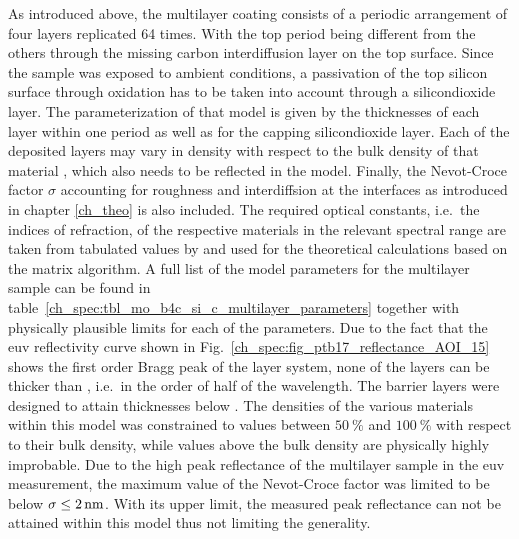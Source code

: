 As introduced above, the multilayer coating consists of a periodic arrangement of four layers replicated 64 times. With the top period being different from the others through the missing carbon interdiffusion layer on the top surface. Since the sample was exposed to ambient conditions, a passivation of the top silicon surface through oxidation has to be taken into account through a silicondioxide layer. The parameterization of that model is given by the thicknesses of each layer within one period as well as for the capping silicondioxide layer. Each of the deposited layers may vary in density with respect to the bulk density of that material \cite{braun_mo/si_2002}, which also needs to be reflected in the model. Finally, the Nevot-Croce factor $\sigma$ accounting for roughness and interdiffsion at the interfaces as introduced in chapter \ref{ch_theo} is also included. The required optical constants, i.e.~the indices of refraction, of the respective materials in the relevant spectral range are taken from tabulated values by \textcite{henke_x-ray_1993} and used for the theoretical calculations based on the matrix algorithm. A full list of the model parameters for the multilayer sample can be found in table~\ref{ch_spec:tbl_mo_b4c_si_c_multilayer_parameters} together with physically plausible limits for each of the parameters. Due to the fact that the \gls{euv} reflectivity curve shown in Fig.~\ref{ch_spec:fig_ptb17_reflectance_AOI_15} shows the first order Bragg peak of the layer system, none of the layers can be thicker than , i.e.~in the order of half of the wavelength. The barrier layers were designed to attain thicknesses below . The densities of the various materials within this model was constrained to values between $\SI{50}{\percent}$ and $\SI{100}{\percent}$ with respect to their bulk density, while values above the bulk density are physically highly improbable. Due to the high peak reflectance of the multilayer sample in the \gls{euv} measurement, the maximum value of the Nevot-Croce factor was limited to be below $\sigma \leq \nm{2}$. With its upper limit, the measured peak reflectance can not be attained within this model thus not limiting the generality.
